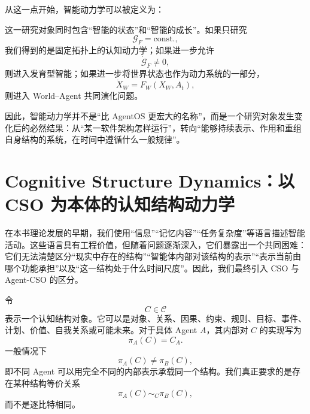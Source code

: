 从这一点开始，智能动力学可以被定义为：

\begin{statementbox}
\centering
{}
\end{statementbox}

这一研究对象同时包含“智能的状态”和“智能的成长”。如果只研究
\begin{equation}
\mathcal{G}_{F}=\mathrm{const.},
\end{equation}
我们得到的是固定拓扑上的认知动力学；如果进一步允许
\begin{equation}
\dot{\mathcal{G}}_{F}\neq 0,
\end{equation}
则进入发育型智能；如果进一步将世界状态也作为动力系统的一部分，
\begin{equation}
\dot X_W
=
F_W(X_W,A_t),
\end{equation}
则进入 World--Agent 共同演化问题。

因此，智能动力学并不是“比 AgentOS 更宏大的名称”，而是一个研究对象发生变化后的必然结果：从“某一软件架构怎样运行”，转向“能够持续表示、作用和重组自身结构的系统，在时间中遵循什么一般规律”。

\section{Cognitive Structure Dynamics：以 CSO 为本体的认知结构动力学}

在本书理论发展的早期，我们使用“信息”“记忆内容”“任务复杂度”等语言描述智能活动。这些语言具有工程价值，但随着问题逐渐深入，它们暴露出一个共同困难：它们无法清楚区分“现实中存在的结构”“智能体内部对该结构的表示”“表示当前由哪个功能承担”以及“这一结构处于什么时间尺度”。因此，我们最终引入 CSO 与 Agent-CSO 的区分。

令
\begin{equation}
C\in\mathcal{C}
\end{equation}
表示一个认知结构对象。它可以是对象、关系、因果、约束、规则、目标、事件、计划、价值、自我关系或可能未来。对于具体 Agent $A$，其内部对 $C$ 的实现写为
\begin{equation}
\pi_A(C)=C_A.
\end{equation}
一般情况下
\begin{equation}
\pi_A(C)\neq\pi_B(C),
\end{equation}
即不同 Agent 可以用完全不同的内部表示承载同一个结构。我们真正要求的是存在某种结构等价关系
\begin{equation}
\pi_A(C)\sim_C\pi_B(C),
\end{equation}
而不是逐比特相同。

